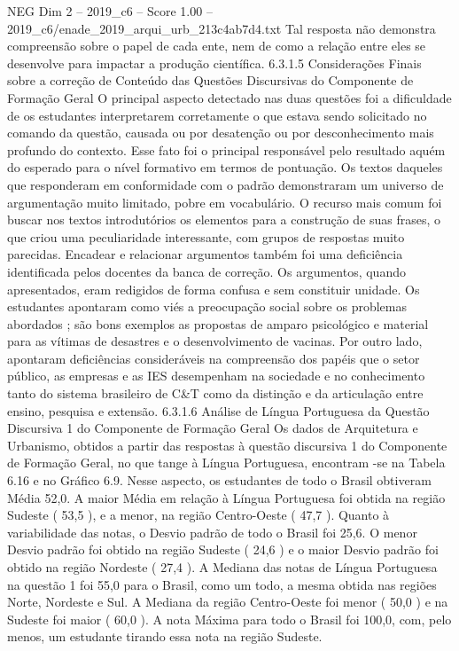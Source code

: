\begin{textsample}{NEG Dim 2 – 2019\_c6 – Score 1.00 – 2019\_c6/enade\_2019\_arqui\_urb\_213c4ab7d4.txt}
Tal resposta não demonstra compreensão sobre o papel de cada ente, nem de como a relação entre eles se desenvolve para impactar a produção científica. 6.3.1.5 Considerações Finais sobre a correção de Conteúdo das Questões Discursivas do Componente de Formação Geral O principal aspecto detectado nas duas questões foi a dificuldade de os estudantes interpretarem corretamente o que estava sendo solicitado no comando da questão, causada ou por desatenção ou por desconhecimento mais profundo do contexto.
Esse fato foi o principal responsável pelo resultado aquém do esperado para o nível formativo em termos de pontuação.
Os textos daqueles que responderam em conformidade com o padrão demonstraram um universo de argumentação muito limitado, pobre em vocabulário.
O recurso mais comum foi buscar nos textos introdutórios os elementos para a construção de suas frases, o que criou uma peculiaridade interessante, com grupos de respostas muito parecidas.
Encadear e relacionar argumentos também foi uma deficiência identificada pelos docentes da banca de correção.
Os argumentos, quando apresentados, eram redigidos de forma confusa e sem constituir unidade.
Os estudantes apontaram como viés a preocupação social sobre os problemas abordados ; são bons exemplos as propostas de amparo psicológico e material para as vítimas de desastres e o desenvolvimento de vacinas.
Por outro lado, apontaram deficiências consideráveis na compreensão dos papéis que o setor público, as empresas e as IES desempenham na sociedade e no conhecimento tanto do sistema brasileiro de C\&T como da distinção e da articulação entre ensino, pesquisa e extensão. 6.3.1.6 Análise de Língua Portuguesa da Questão Discursiva 1 do Componente de Formação Geral Os dados de Arquitetura e Urbanismo, obtidos a partir das respostas à questão discursiva 1 do Componente de Formação Geral, no que tange à Língua Portuguesa, encontram -se na Tabela 6.16 e no Gráfico 6.9.
Nesse aspecto, os estudantes de todo o Brasil obtiveram Média 52,0.
A maior Média em relação à Língua Portuguesa foi obtida na região Sudeste ( 53,5 ), e a menor, na região Centro-Oeste ( 47,7 ).
Quanto à variabilidade das notas, o Desvio padrão de todo o Brasil foi 25,6.
O menor Desvio padrão foi obtido na região Sudeste ( 24,6 ) e o maior Desvio padrão foi obtido na região Nordeste ( 27,4 ).
A Mediana das notas de Língua Portuguesa na questão 1 foi 55,0 para o Brasil, como um todo, a mesma obtida nas regiões Norte, Nordeste e Sul.
A Mediana da região Centro-Oeste foi menor ( 50,0 ) e na Sudeste foi maior ( 60,0 ).
A nota Máxima para todo o Brasil foi 100,0, com, pelo menos, um estudante tirando essa nota na região Sudeste.

\end{textsample}
